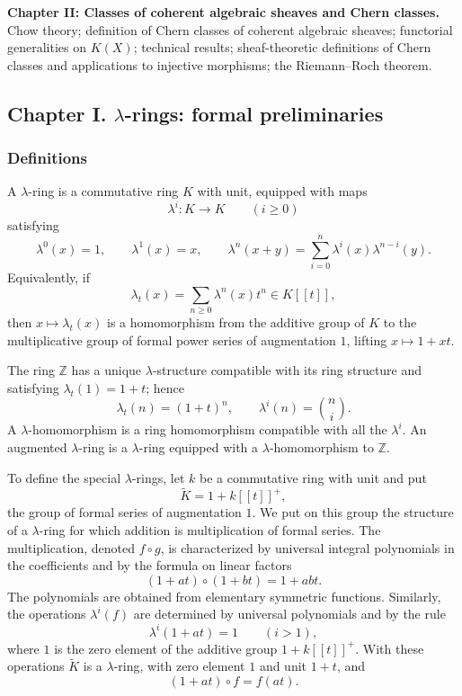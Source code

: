\documentclass[11pt]{article}
\theoremstyle{plain}
\theoremstyle{definition}
\theoremstyle{remark}
\newcommand{\ZZ}{\mathbb Z}
\begin{document}
\textbf{Chapter II: Classes of coherent algebraic sheaves and Chern classes.} Chow theory; definition of Chern classes of coherent algebraic sheaves; functorial generalities on $K(X)$; technical results; sheaf-theoretic definitions of Chern classes and applications to injective morphisms; the Riemann--Roch theorem.

\subsection{Chapter I. $\lambda$-rings: formal preliminaries}

\subsubsection{Definitions}

A $\lambda$-ring is a commutative ring $K$ with unit, equipped with maps
\[
   \lambda^i:K\to K\qquad (i\geq 0)
\]
satisfying
\begin{equation}\label{eq:lambdarules}
\lambda^0(x)=1,
\qquad \lambda^1(x)=x,
\qquad
\lambda^n(x+y)=\sum_{i=0}^n\lambda^i(x)\lambda^{n-i}(y).
\end{equation}
Equivalently, if
\[
   \lambda_t(x)=\sum_{n\geq 0}\lambda^n(x)t^n\in K[[t]],
\]
then $x\mapsto \lambda_t(x)$ is a homomorphism from the additive group of $K$ to the multiplicative group of formal power series of augmentation $1$, lifting $x\mapsto 1+xt$.

The ring $\ZZ$ has a unique $\lambda$-structure compatible with its ring structure and satisfying $\lambda_t(1)=1+t$; hence
\[
   \lambda_t(n)=(1+t)^n,
   \qquad
   \lambda^i(n)=\binom{n}{i}.
\]
A $\lambda$-homomorphism is a ring homomorphism compatible with all the $\lambda^i$. An augmented $\lambda$-ring is a $\lambda$-ring equipped with a $\lambda$-homomorphism to $\ZZ$.

To define the special $\lambda$-rings, let $k$ be a commutative ring with unit and put
\[
   \widetilde K=1+k[[t]]^+,
\]
the group of formal series of augmentation $1$. We put on this group the structure of a $\lambda$-ring for which addition is multiplication of formal series. The multiplication, denoted $f\circ g$, is characterized by universal integral polynomials in the coefficients and by the formula on linear factors
\begin{equation}\label{eq:circ}
   (1+at)\circ(1+bt)=1+abt.
\end{equation}
The polynomials are obtained from elementary symmetric functions. Similarly, the operations $\lambda^i(f)$ are determined by universal polynomials and by the rule
\[
   \lambda^i(1+at)=1\qquad (i>1),
\]
where $1$ is the zero element of the additive group $1+k[[t]]^+$. With these operations $\widetilde K$ is a $\lambda$-ring, with zero element $1$ and unit $1+t$, and
\begin{equation}\label{eq:linearfactor}
   (1+at)\circ f=f(at).
\end{equation}
\end{document}
